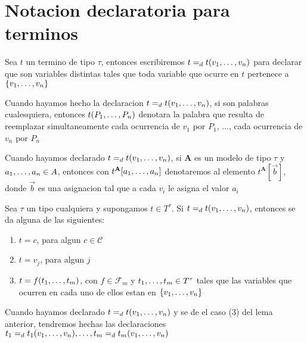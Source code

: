 
\section{Notacion declaratoria para terminos}
\begin{definition}
  Sea $t$ un termino de tipo $\tau$, entonces escribiremos $t =_d t(v_{1}, \dots, v_{n})$
  para declarar que  son variables distintas tales que toda variable que ocurre en 
  $t$ pertenece a $\{v_{1}, \dots, v_{n}\}$
\end{definition}

\begin{convention}
  Cuando hayamos hecho la declaracion $t =_d t(v_{1}, \dots, v_{n})$, si 
  son palabras cualesquiera, entonces $t(P_{1}, \dots, P_{n})$ denotara la palabra que resulta de reemplazar
  simultaneamente cada ocurrencia de $v_1$ por $P_1$, $\dots$, cada ocurrencia de $v_n$ por $P_n$
\end{convention}
\begin{convention}
  Cuando hayamos declarado $t =_d t(v_{1}, \dots, v_{n})$, si $\mathbf{A}$ es un modelo de 
  tipo $\tau$ y $a_{1}, \dots, a_{n} \in A$, entonces con $t^\mathbf{A}[a_{1}, \dots, a_{n}]$
  denotaremos al elemento $t^\mathbf{A}[\vec{b}]$, donde $\vec{b}$ es una asignacion tal que a cada
  $v_i$ le asigna el valor $a_i$
\end{convention}

\begin{lemma}
  Sea $\tau$ un tipo cualquiera y supongamos $t \in T^\tau$. Si $t =_d t(v_{1}, \dots, v_{n})$,
  entonces se da alguna de las siguientes: \begin{enumerate}
    \item $t = c$, para algun $c \in \mathcal{C}$
    \item $t = v_j$, para algun $j$
    \item $t = f(t_{1}, \dots, t_{m})$, con $f \in \mathcal{F}_m$ y $t_{1}, \dots, t_{m} \in T^\tau$ tales
    que las variables que ocurren en cada uno de ellos estan en $\{v_{1}, \dots, v_{n}\}$
  \end{enumerate}
\end{lemma}

\begin{convention}
  Cuando hayamos declarado $t =_d t(v_{1}, \dots, v_{n})$ y se de el caso (3) del lema anterior,
  tendremos hechas las declaraciones $t_1 =_d t_1(v_{1}, \dots, v_{n}), \dots, t_m =_d t_m(v_{1}, \dots, v_{n})$
\end{convention}

